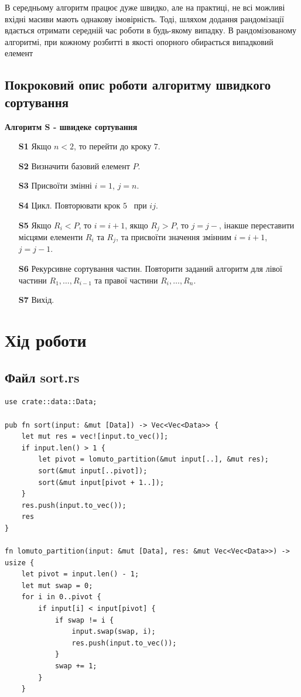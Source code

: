 \documentclass{article}
\begin{document}
\begin{normalsize}
		В середньому алгоритм працює дуже швидко, але на практиці, не всі можливі вхідні масиви мають однакову імовірність. Тоді, шляхом додання рандомізації вдається отримати середній час роботи в будь-якому випадку. В рандомізованому алгоритмі, при кожному розбитті в якості опорного обирається випадковий елемент
		
		\subsection*{Покроковий опис роботи алгоритму швидкого сортування}
		\textbf{Алгоритм S - швидеке сортування}
		\begin{enumerate}
			\item [\textbf{S1}] Якщо $n < 2$, то перейти до кроку $7$.
			\item [\textbf{S2}] Визначити базовий елемент $P$.
			\item [\textbf{S3}] Присвоїти змінні $i=1$, $j=n$.
			\item [\textbf{S4}] Цикл. Повторювати крок $5$  при $ij$.
			\item [\textbf{S5}] Якщо $R_i<P$, то $i=i+1$, якщо $R_j>P$, то $j=j-$, інакше переставити місцями елементи $R_i$ та $R_j$, та присвоїти значення змінним $i=i+1$, $j=j-1$.
			\item [\textbf{S6}] Рекурсивне сортування частин. Повторити заданий алгоритм для лівої частини $R_1,…,R_{i-1}$ та правої частини $R_i,…, R_n$.
			\item [\textbf{S7}] Вихід.
		\end{enumerate}
		
		\newpage
		
		\section*{Хід роботи}
		\subsection*{Файл sort.rs}
		\begin{lstlisting}
use crate::data::Data;

pub fn sort(input: &mut [Data]) -> Vec<Vec<Data>> {
	let mut res = vec![input.to_vec()];
	if input.len() > 1 {
		let pivot = lomuto_partition(&mut input[..], &mut res);
		sort(&mut input[..pivot]);
		sort(&mut input[pivot + 1..]);
	}
	res.push(input.to_vec());
	res
}

fn lomuto_partition(input: &mut [Data], res: &mut Vec<Vec<Data>>) -> usize {
	let pivot = input.len() - 1;
	let mut swap = 0;
	for i in 0..pivot {
		if input[i] < input[pivot] {
			if swap != i {
				input.swap(swap, i);
				res.push(input.to_vec());
			}
			swap += 1;
		}
	}
	

\end{lstlisting}
\end{normalsize}
\end{document}
